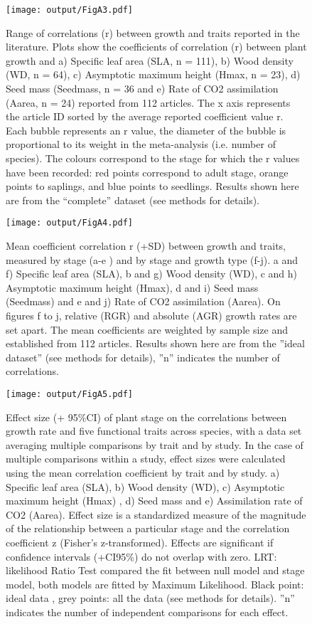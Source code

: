 \documentclass[a4paper,11pt]{article}
\begin{document}
\begin{appendices}
\begin{figure}[h!]
\centering
\texttt{[image: output/FigA3.pdf]}
\caption{Range of correlations (r) between
growth and traits reported in the literature. Plots show the coefficients of correlation (r)
between plant growth and a) Specific leaf area (SLA, n =
111), b) Wood density (WD, n = 64), c) Asymptotic
maximum height (Hmax, n = 23), d) Seed mass (Seedmass, n = 36 and
e) Rate of CO2 assimilation (Aarea, n = 24) reported from 112
articles. The x axis represents the article ID sorted by the average reported coefficient value r. Each bubble represents an r value, the diameter of the bubble is proportional to its weight in the meta-analysis (i.e. number of species). The colours correspond to the stage for which the r values have been recorded: red points correspond to adult stage, orange points to saplings, and blue points to seedlings. Results shown here are from the ``complete'' dataset (see methods for details). }
\label{fig:figA3}
\end{figure}

\begin{figure}[h!]
\centering
\texttt{[image: output/FigA4.pdf]}
\caption{Mean coefficient correlation r (+SD) between growth and traits, measured by stage (a-e
) and by stage and growth type (f-j). a and f) Specific leaf area (SLA), b and g) Wood density (WD), c and h) Asymptotic maximum height (Hmax), d and i) Seed mass (Seedmass) and e and j) Rate of CO2 assimilation (Aarea). On figures f to j, relative (RGR) and absolute (AGR) growth rates are set apart. The mean coefficients are weighted by sample size and established from 112 articles. Results shown here are from the ''ideal dataset'' (see methods for details), ''n'' indicates the number of correlations.}
\label{fig:figA4}
\end{figure}

\begin{figure}[h!]
\centering
\texttt{[image: output/FigA5.pdf]}
\caption{Effect size (+ 95\%CI) of plant stage on the correlations between growth rate and five functional traits across species, with a data set averaging multiple comparisons by trait and by study. In the case of multiple comparisons within a study, effect sizes were calculated using the mean correlation coefficient by trait and by study. a) Specific leaf area (SLA), b) Wood density (WD), c) Asymptotic maximum height (Hmax) , d) Seed mass and e) Assimilation rate of CO2 (Aarea). Effect size is a standardized measure of the magnitude of the relationship between a particular stage and the correlation coefficient z (Fisher's z-transformed). Effects are significant if confidence intervals (+CI95\%) do not overlap with zero. LRT: likelihood Ratio Test compared the fit between null model and stage model, both models are fitted by Maximum Likelihood. Black point: ideal data , grey points: all the data (see methods for details). ''n'' indicates the number of independent comparisons for each effect.}
\label{fig:figA5}
\end{figure}



\end{appendices}
\end{document}
